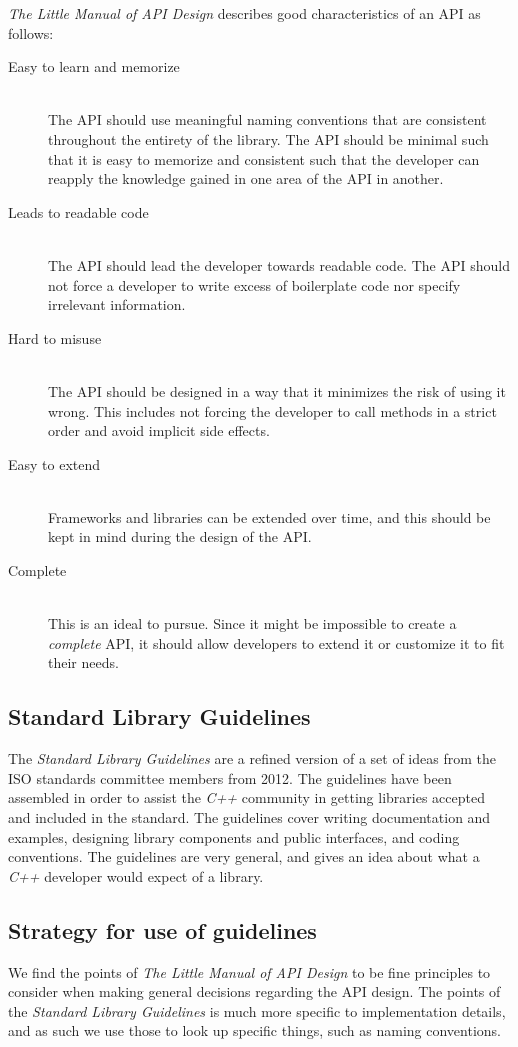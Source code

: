 \textit{The Little Manual of API Design} describes good characteristics of an API as follows:
\begin{description}
\item[Easy to learn and memorize] \hfill \\
The API should use meaningful naming conventions that are consistent throughout the entirety of the library. The API should be minimal such that it is easy to memorize and consistent such that the developer can reapply the knowledge gained in one area of the API in another.
\item[Leads to readable code] \hfill \\
The API should lead the developer towards readable code. The API should not force a developer to write excess of boilerplate code nor specify irrelevant information.
\item[Hard to misuse] \hfill \\
The API should be designed in a way that it minimizes the risk of using it wrong. This includes not forcing the developer to call methods in a strict order and avoid implicit side effects.
\item[Easy to extend]\hfill \\
Frameworks and libraries can be extended over time, and this should be kept in mind during the design of the API.
\item[Complete] \hfill \\
This is an ideal to pursue. Since it might be impossible to create a \textit{complete} API, it should allow developers to extend it or customize it to fit their needs.
\end{description}

\subsection{Standard Library Guidelines}
The \textit{Standard Library Guidelines} are a refined version of a set of ideas from the ISO standards committee members from 2012. The guidelines have been assembled in order to assist the \textit{C++} community in getting libraries accepted and included in the standard. The guidelines cover writing documentation and examples, designing library components and public interfaces, and coding conventions. The guidelines are very general, and gives an idea about what a \textit{C++} developer would expect of a library.

\subsection{Strategy for use of guidelines}
We find the points of \textit{The Little Manual of API Design} to be fine principles to consider when making general decisions regarding the API design. The points of the \textit{Standard Library Guidelines} is much more specific to implementation details, and as such we use those to look up specific things, such as naming conventions.

